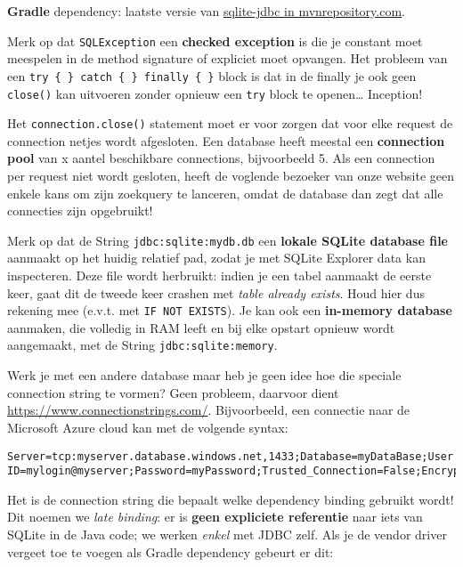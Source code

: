 \documentclass[
]{article}
\begin{document}
\textbf{Gradle} dependency: laatste versie van
\href{https://mvnrepository.com/artifact/org.xerial/sqlite-jdbc}{sqlite-jdbc
in mvnrepository.com}.

Merk op dat \texttt{SQLException} een \textbf{checked exception} is die
je constant moet meespelen in de method signature of expliciet moet
opvangen. Het probleem van een
\texttt{try\ \{\ \}\ catch\ \{\ \}\ finally\ \{\ \}} block is dat in de
finally je ook geen \texttt{close()} kan uitvoeren zonder opnieuw een
\texttt{try} block te openen\ldots{} Inception!

Het \texttt{connection.close()} statement moet er voor zorgen dat voor
elke request de connection netjes wordt afgesloten. Een database heeft
meestal een \textbf{connection pool} van x aantel beschikbare
connections, bijvoorbeeld 5. Als een connection per request niet wordt
gesloten, heeft de voglende bezoeker van onze website geen enkele kans
om zijn zoekquery te lanceren, omdat de database dan zegt dat alle
connecties zijn opgebruikt!

Merk op dat de String \texttt{jdbc:sqlite:mydb.db} een \textbf{lokale
SQLite database file} aanmaakt op het huidig relatief pad, zodat je met
SQLite Explorer data kan inspecteren. Deze file wordt herbruikt: indien
je een tabel aanmaakt de eerste keer, gaat dit de tweede keer crashen
met \emph{table already exists}. Houd hier dus rekening mee (e.v.t. met
\texttt{IF\ NOT\ EXISTS}). Je kan ook een \textbf{in-memory database}
aanmaken, die volledig in RAM leeft en bij elke opstart opnieuw wordt
aangemaakt, met de String \texttt{jdbc:sqlite:memory}.

Werk je met een andere database maar heb je geen idee hoe die speciale
connection string te vormen? Geen probleem, daarvoor dient
\url{https://www.connectionstrings.com/}. Bijvoorbeeld, een connectie
naar de Microsoft Azure cloud kan met de volgende syntax:

\begin{verbatim}
Server=tcp:myserver.database.windows.net,1433;Database=myDataBase;User ID=mylogin@myserver;Password=myPassword;Trusted_Connection=False;Encrypt=True;
\end{verbatim}

Het is de connection string die bepaalt welke dependency binding
gebruikt wordt! Dit noemen we \emph{late binding}: er is \textbf{geen
expliciete referentie} naar iets van SQLite in de Java code; we werken
\emph{enkel} met JDBC zelf. Als je de vendor driver vergeet toe te
voegen als Gradle dependency gebeurt er dit:
\end{document}
